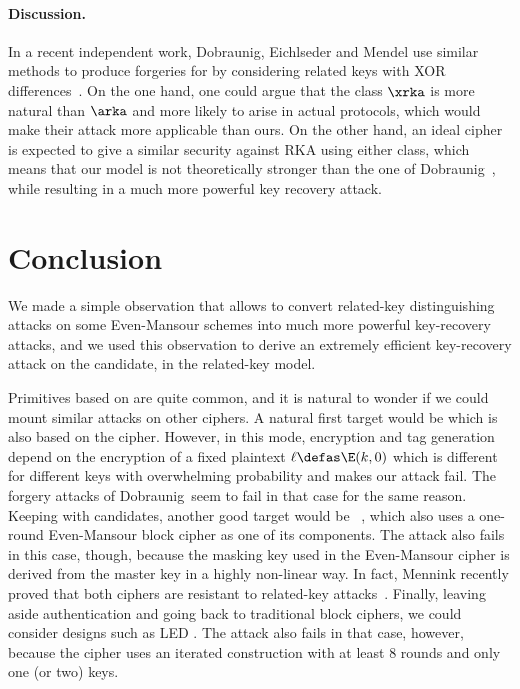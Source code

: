 \paragraph{Discussion.}

In a recent independent work, Dobraunig, Eichlseder and Mendel use similar methods to produce forgeries for \proestotr by considering
related keys with XOR differences~\cite{DEM15}. On the one hand, one could argue that the class $\xrka$ is more natural than $\arka$
and more likely to arise in actual protocols, which would
make their attack more applicable than ours. On the other hand, an ideal cipher is expected to give a similar security against
RKA using either class, which means that our model is not theoretically stronger than the one of Dobraunig~\etal, while resulting in a
much more powerful key recovery attack.

\section{Conclusion}

We made a simple observation that allows to convert related-key distinguishing attacks on some Even-Mansour schemes into much more
powerful key-recovery attacks, and we used this observation to derive an extremely efficient key-recovery attack on the
\proestotr \caesar candidate, in the related-key model.

Primitives based on \EM are quite common, and it is natural to wonder if we could mount similar
attacks on other ciphers. A natural first target would be \proestcopa which is also based on the \proestem cipher.
However, in this mode,
encryption and tag generation depend on the encryption of a fixed plaintext $\ell \defas \E(k, 0)$ which is different
for different keys with overwhelming probability and makes our attack fail. The forgery attacks of
Dobraunig~\etal seem to fail in that case for the same reason.
Keeping with \caesar candidates, another good target would be \minalpher~\cite{minalpher}, which also
uses a one-round Even-Mansour block cipher as one of its components. The attack also fails in this
case, though, because the masking key used in the Even-Mansour cipher is derived from the master key
in a highly non-linear way. In fact, Mennink recently proved that both ciphers are resistant
to related-key attacks~\cite{DBLP:conf/crypto/Mennink16}.
Finally, leaving aside authentication and
going back to traditional block ciphers, we could consider designs such as LED \cite{LED}. The attack
also fails in that case, however, because the cipher uses an iterated construction with at least 8 rounds and
only one (or two) keys.

